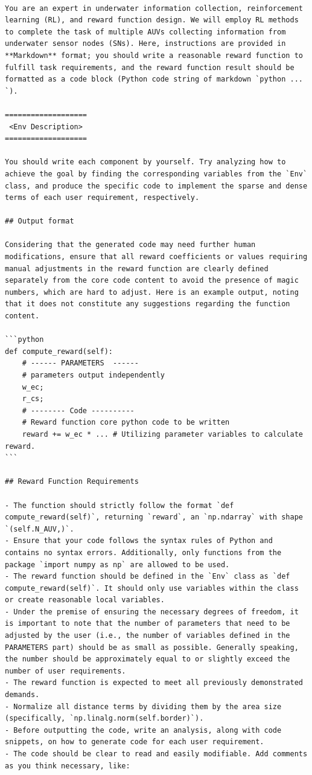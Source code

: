 \documentclass{article}
\begin{document}
\begin{verbatim}

You are an expert in underwater information collection, reinforcement learning (RL), and reward function design. We will employ RL methods to complete the task of multiple AUVs collecting information from underwater sensor nodes (SNs). Here, instructions are provided in **Markdown** format; you should write a reasonable reward function to fulfill task requirements, and the reward function result should be formatted as a code block (Python code string of markdown `python ... `).

===================
 <Env Description>
===================

You should write each component by yourself. Try analyzing how to achieve the goal by finding the corresponding variables from the `Env` class, and produce the specific code to implement the sparse and dense terms of each user requirement, respectively.

## Output format

Considering that the generated code may need further human modifications, ensure that all reward coefficients or values requiring manual adjustments in the reward function are clearly defined separately from the core code content to avoid the presence of magic numbers, which are hard to adjust. Here is an example output, noting that it does not constitute any suggestions regarding the function content.

```python
def compute_reward(self):
    # ------ PARAMETERS  ------
    # parameters output independently
    w_ec;
    r_cs;
    # -------- Code ----------
    # Reward function core python code to be written
    reward += w_ec * ... # Utilizing parameter variables to calculate reward.
```

## Reward Function Requirements

- The function should strictly follow the format `def compute_reward(self)`, returning `reward`, an `np.ndarray` with shape `(self.N_AUV,)`.
- Ensure that your code follows the syntax rules of Python and contains no syntax errors. Additionally, only functions from the package `import numpy as np` are allowed to be used.
- The reward function should be defined in the `Env` class as `def compute_reward(self)`. It should only use variables within the class or create reasonable local variables.
- Under the premise of ensuring the necessary degrees of freedom, it is important to note that the number of parameters that need to be adjusted by the user (i.e., the number of variables defined in the PARAMETERS part) should be as small as possible. Generally speaking, the number should be approximately equal to or slightly exceed the number of user requirements.
- The reward function is expected to meet all previously demonstrated demands.
- Normalize all distance terms by dividing them by the area size (specifically, `np.linalg.norm(self.border)`).
- Before outputting the code, write an analysis, along with code snippets, on how to generate code for each user requirement.
- The code should be clear to read and easily modifiable. Add comments as you think necessary, like:


\end{verbatim}
\end{document}

